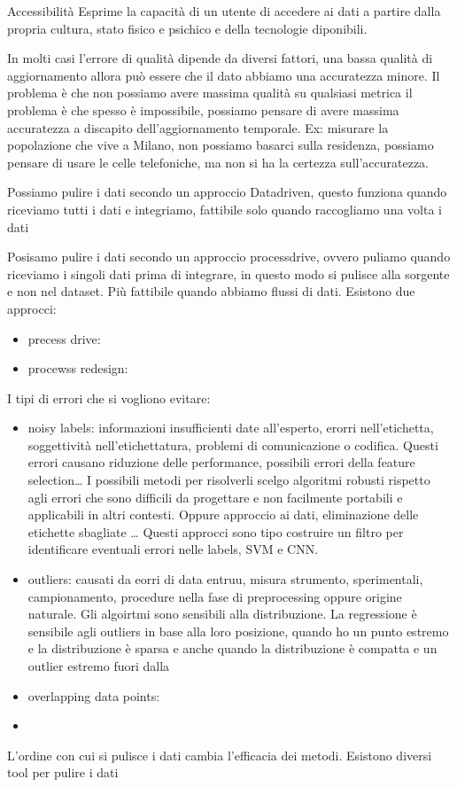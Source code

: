 Accessibilità
Esprime la capacità di un utente di accedere ai dati a partire dalla propria cultura, stato 
fisico e psichico e della tecnologie diponibili.

In molti casi l'errore di qualità dipende da diversi fattori, una bassa qualità di 
aggiornamento allora può essere che il dato abbiamo una accuratezza minore. Il problema 
è che non possiamo avere massima qualità su qualsiasi metrica il problema è che 
spesso è impossibile, possiamo pensare di avere massima accuratezza a discapito 
dell'aggiornamento temporale. Ex: misurare la popolazione che vive a Milano, non 
possiamo basarci sulla residenza, possiamo pensare di usare le celle telefoniche, ma
non si ha la certezza sull'accuratezza.

Possiamo pulire i dati secondo un approccio Datadriven, questo funziona quando 
riceviamo tutti i dati e integriamo, fattibile solo quando raccogliamo una volta i dati

Posisamo pulire i dati secondo un approccio processdrive, ovvero puliamo quando 
riceviamo i singoli dati prima di integrare, in questo modo si pulisce alla sorgente 
e non nel dataset. Più fattibile quando abbiamo flussi di dati.
Esistono due approcci:
\begin{itemize}
      \item precess drive: 
      \item procewss redesign:
\end{itemize}

I tipi di errori che si vogliono evitare:
\begin{itemize}
      \item noisy labels: informazioni insufficienti date all'esperto, erorri 
      nell'etichetta, soggettività nell'etichettatura, problemi di comunicazione o codifica.
      Questi errori causano riduzione delle performance, possibili errori della 
      feature selection\dots
      I possibili metodi per risolverli scelgo algoritmi robusti rispetto agli errori
      che sono difficili da progettare e non facilmente portabili e applicabili in altri 
      contesti. Oppure approccio ai dati, eliminazione delle etichette sbagliate \dots
      Questi approcci sono tipo costruire un filtro per identificare eventuali errori
      nelle labels, SVM e CNN.
      \item outliers: causati da eorri di data entruu, misura strumento, sperimentali,
      campionamento, procedure nella fase di preprocessing oppure origine naturale.
      Gli algoirtmi sono sensibili alla distribuzione. La regressione è sensibile 
      agli outliers in base alla loro posizione, quando ho un punto estremo e la 
      distribuzione è sparsa e anche quando la distribuzione è compatta e un outlier estremo
      fuori dalla 
      \item overlapping data points:
      \item 
\end{itemize}

L'ordine con cui si pulisce i dati cambia l'efficacia dei metodi. Esistono diversi 
tool per pulire i dati